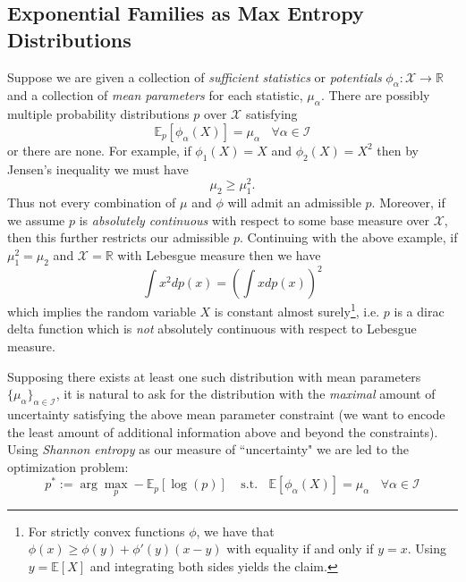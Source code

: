 \subsection{Exponential Families as Max Entropy Distributions}

Suppose we are given a collection of \emph{sufficient statistics} or \emph{potentials} $\phi_\alpha: \mathcal{X} \rightarrow \mathbb{R}$ and a collection of \emph{mean parameters} for each statistic, $\mu_\alpha$.  There are possibly multiple probability distributions $p$ over $\mathcal{X}$ satisfying
$$
\mathbb{E}_p[\phi_\alpha(X)] = \mu_\alpha \ \ \ \ \forall \alpha\in\mathcal{I}
$$
or there are none.  For example, if $\phi_1(X) = X$ and $\phi_2(X) = X^2$ then by Jensen's inequality we must have
$$
\mu_2 \geq \mu_1 ^2.
$$
Thus not every combination of $\mu$ and $\phi$ will admit an admissible $p$.  Moreover, if we assume $p$ is \emph{absolutely continuous} with respect to some base measure over $\mathcal{X}$, then this further restricts our admissible $p$.  Continuing with the above example, if $\mu_1^2 = \mu_2$ and $\mathcal{X} = \mathbb{R}$ with Lebesgue measure then we have
$$
\int x^2 dp(x) = \left(\int x dp(x)\right)^2
$$
which implies the random variable $X$ is constant almost surely\footnote{For strictly convex functions $\phi$, we have that $\phi(x) \geq \phi(y) + \phi'(y)(x -y)$ with equality if and only if $y=x$.  Using $y=\mathbb{E}[X]$ and integrating both sides yields the claim.}, i.e. $p$ is a dirac delta function which is \emph{not} absolutely continuous with respect to Lebesgue measure.

Supposing there exists at least one such distribution with mean parameters $\{\mu_\alpha\}_{\alpha\in\mathcal{I}}$, it is natural to ask for the distribution with the \emph{maximal} amount of uncertainty satisfying the above mean parameter constraint (we want to encode the least amount of additional information above and beyond the constraints).  Using \emph{Shannon entropy} as our measure of ``uncertainty" we are led to the optimization problem:
$$
p^* := \arg\max_{p} -\mathbb{E}_p[\log(p)] \ \ \ \ \ \text{s.t.}\ \ \ \  \mathbb{E}[\phi_\alpha(X)] = \mu_\alpha \ \ \ \ \forall \alpha\in\mathcal{I}
$$
